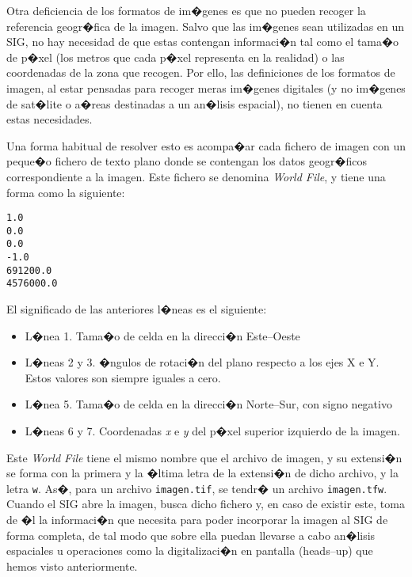 Otra deficiencia de los formatos de im�genes es que no pueden recoger la referencia geogr�fica de la imagen. Salvo que las im�genes sean utilizadas en un SIG, no hay necesidad de que estas contengan informaci�n tal como el tama�o de p�xel (los metros que cada p�xel representa en la realidad) o las coordenadas de la zona que recogen. Por ello, las definiciones de los formatos de imagen, al estar pensadas para recoger meras im�genes digitales (y no im�genes de sat�lite o a�reas destinadas a un an�lisis espacial), no tienen en cuenta estas necesidades.

Una forma habitual de resolver esto es acompa�ar cada fichero de imagen con un peque�o fichero de texto plano donde se contengan los datos geogr�ficos correspondiente a la imagen. Este fichero se denomina \emph{World File}, y tiene una forma como la siguiente:

\vspace{.5cm}

\begin{minipage}{\linewidth}
\begin{verbatim}
1.0
0.0
0.0
-1.0
691200.0
4576000.0
\end{verbatim}
\end{minipage}

\vspace{.5cm}

El significado de las anteriores l�neas es el siguiente:
\begin{itemize}
\item L�nea 1. Tama�o de celda en la direcci�n Este--Oeste
\item L�neas 2 y 3. �ngulos de rotaci�n del plano respecto a los ejes X e Y. Estos valores son siempre iguales a cero.
\item L�nea 5. Tama�o de celda en la direcci�n Norte--Sur, con signo negativo
\item L�neas 6 y 7. Coordenadas \emph{x} e \emph{y} del p�xel superior izquierdo de la imagen.
\end{itemize}

Este \emph{World File} tiene el mismo nombre que el archivo de imagen, y su extensi�n se forma con la primera y la �ltima letra de la extensi�n de dicho archivo, y la letra \texttt{w}. As�, para un archivo \texttt{imagen.tif}, se tendr� un archivo \texttt{imagen.tfw}. Cuando el SIG abre la imagen, busca dicho fichero y, en caso de existir este, toma de �l la informaci�n que necesita para poder incorporar la imagen al SIG de forma completa, de tal modo que sobre ella puedan llevarse a cabo an�lisis espaciales u operaciones como la digitalizaci�n en pantalla (heads--up) que hemos visto anteriormente.

